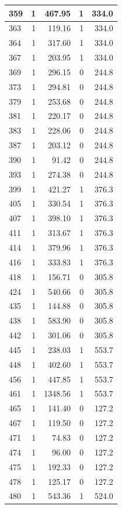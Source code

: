 \documentclass[
  12pt,
]{book}
\begin{document}
\begin{tabular}{l|r|r|r|r}
\hline
359 & 1 & 467.95 & 1 & 334.0\\
\hline
363 & 1 & 119.16 & 1 & 334.0\\
\hline
364 & 1 & 317.60 & 1 & 334.0\\
\hline
367 & 1 & 203.95 & 1 & 334.0\\
\hline
369 & 1 & 296.15 & 0 & 244.8\\
\hline
373 & 1 & 294.81 & 0 & 244.8\\
\hline
379 & 1 & 253.68 & 0 & 244.8\\
\hline
381 & 1 & 220.17 & 0 & 244.8\\
\hline
383 & 1 & 228.06 & 0 & 244.8\\
\hline
387 & 1 & 203.12 & 0 & 244.8\\
\hline
390 & 1 & 91.42 & 0 & 244.8\\
\hline
393 & 1 & 274.38 & 0 & 244.8\\
\hline
399 & 1 & 421.27 & 1 & 376.3\\
\hline
405 & 1 & 330.54 & 1 & 376.3\\
\hline
407 & 1 & 398.10 & 1 & 376.3\\
\hline
411 & 1 & 313.67 & 1 & 376.3\\
\hline
414 & 1 & 379.96 & 1 & 376.3\\
\hline
416 & 1 & 333.83 & 1 & 376.3\\
\hline
418 & 1 & 156.71 & 0 & 305.8\\
\hline
424 & 1 & 540.66 & 0 & 305.8\\
\hline
435 & 1 & 144.88 & 0 & 305.8\\
\hline
438 & 1 & 583.90 & 0 & 305.8\\
\hline
442 & 1 & 301.06 & 0 & 305.8\\
\hline
445 & 1 & 238.03 & 1 & 553.7\\
\hline
448 & 1 & 402.60 & 1 & 553.7\\
\hline
456 & 1 & 447.85 & 1 & 553.7\\
\hline
461 & 1 & 1348.56 & 1 & 553.7\\
\hline
465 & 1 & 141.40 & 0 & 127.2\\
\hline
467 & 1 & 119.50 & 0 & 127.2\\
\hline
471 & 1 & 74.83 & 0 & 127.2\\
\hline
474 & 1 & 96.00 & 0 & 127.2\\
\hline
475 & 1 & 192.33 & 0 & 127.2\\
\hline
478 & 1 & 125.17 & 0 & 127.2\\
\hline
480 & 1 & 543.36 & 1 & 524.0\\

\end{tabular}
\end{document}
